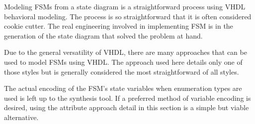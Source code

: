 \begin{my_list}
\item Modeling FSMs from a state diagram is a straightforward process using VHDL behavioral modeling. The process is so straightforward that it is often considered cookie cutter. The real engineering involved in implementing FSM is in the generation of the state diagram that solved the problem at hand.

\item Due to the general versatility of VHDL, there are many approaches that can be used to model FSMs using VHDL. The approach used here details only one of those styles but is generally considered the most straightforward of all styles. 

\item The actual encoding of the FSM's state variables when enumeration types are used is left up to the synthesis tool. If a preferred method of variable encoding is desired, using the attribute approach detail in this section is a simple but viable alternative. 
\end{my_list}

